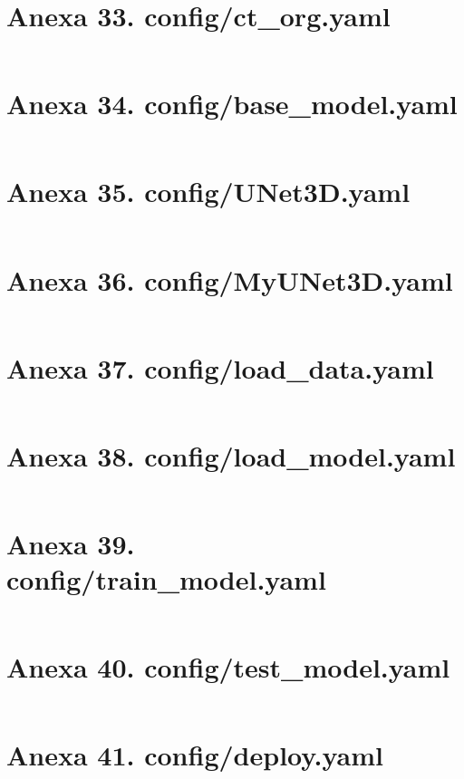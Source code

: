 \section{Anexa 33. config/ct\_org.yaml}
\label{appendix:33_config_ct_org_yaml}
\inputminted[linenos,tabsize=4,breaklines]{yaml}{code/python/config/ct_org.yaml}

\section{Anexa 34. config/base\_model.yaml}
\label{appendix:34_config_base_model_yaml}
\inputminted[linenos,tabsize=4,breaklines]{yaml}{code/python/config/base_model.yaml}

\section{Anexa 35. config/UNet3D.yaml}
\label{appendix:35_config_UNet3D_yaml}
\inputminted[linenos,tabsize=4,breaklines]{yaml}{code/python/config/UNet3D.yaml}

\section{Anexa 36. config/MyUNet3D.yaml}
\label{appendix:36_config_MyUNet3D_yaml}
\inputminted[linenos,tabsize=4,breaklines]{yaml}{code/python/config/MyUNet3D.yaml}

\section{Anexa 37. config/load\_data.yaml}
\label{appendix:37_config_load_data_yaml}
\inputminted[linenos,tabsize=4,breaklines]{yaml}{code/python/config/load_data.yaml}

\section{Anexa 38. config/load\_model.yaml}
\label{appendix:38_config_load_model_yaml}
\inputminted[linenos,tabsize=4,breaklines]{yaml}{code/python/config/load_model.yaml}

\section{Anexa 39. config/train\_model.yaml}
\label{appendix:39_config_train_model_yaml}
\inputminted[linenos,tabsize=4,breaklines]{yaml}{code/python/config/train_model.yaml}

\section{Anexa 40. config/test\_model.yaml}
\label{appendix:40_config_test_model_yaml}
\inputminted[linenos,tabsize=4,breaklines]{yaml}{code/python/config/test_model.yaml}

\section{Anexa 41. config/deploy.yaml}
\label{appendix:41_config_deploy_yaml}
\inputminted[linenos,tabsize=4,breaklines]{yaml}{code/python/config/deploy.yaml}
